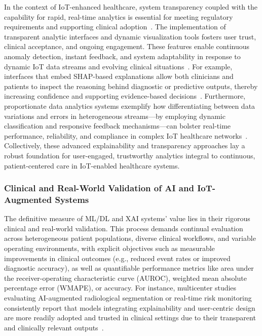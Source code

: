 \documentclass[sigconf]{acmart}
\begin{document}
In the context of IoT-enhanced healthcare, system transparency coupled with the capability for rapid, real-time analytics is essential for meeting regulatory requirements and supporting clinical adoption~\cite{ref90,ref106}. The implementation of transparent analytic interfaces and dynamic visualization tools fosters user trust, clinical acceptance, and ongoing engagement. These features enable continuous anomaly detection, instant feedback, and system adaptability in response to dynamic IoT data streams and evolving clinical situations~\cite{ref87,ref99}. For example, interfaces that embed SHAP-based explanations allow both clinicians and patients to inspect the reasoning behind diagnostic or predictive outputs, thereby increasing confidence and supporting evidence-based decisions~\cite{ref87,ref99}. Furthermore, proportionate data analytics systems exemplify how differentiating between data variations and errors in heterogeneous streams—by employing dynamic classification and responsive feedback mechanisms—can bolster real-time performance, reliability, and compliance in complex IoT healthcare networks~\cite{ref106}. Collectively, these advanced explainability and transparency approaches lay a robust foundation for user-engaged, trustworthy analytics integral to continuous, patient-centered care in IoT-enabled healthcare systems.

\subsubsection{Clinical and Real-World Validation of AI and IoT-Augmented Systems}

The definitive measure of ML/DL and XAI systems’ value lies in their rigorous clinical and real-world validation. This process demands continual evaluation across heterogeneous patient populations, diverse clinical workflows, and variable operating environments, with explicit objectives such as measurable improvements in clinical outcomes (e.g., reduced event rates or improved diagnostic accuracy), as well as quantifiable performance metrics like area under the receiver-operating characteristic curve (AUROC), weighted mean absolute percentage error (WMAPE), or accuracy. For instance, multicenter studies evaluating AI-augmented radiological segmentation or real-time risk monitoring consistently report that models integrating explainability and user-centric design are more readily adopted and trusted in clinical settings due to their transparent and clinically relevant outputs~\cite{ref77,ref80,ref84,ref98,ref99,ref107}.
\end{document}
